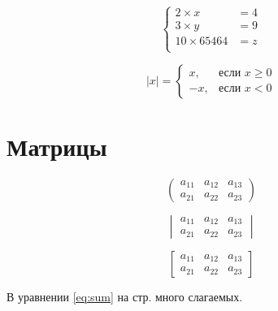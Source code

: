 \documentclass[a4paper,12pt]{article} %
\begin{document}
\[
	\left\{
		\begin{aligned}
			2\times x &= 4  \\
			3\times y &= 9\\
			10 \times 65464 &= z\\
		\end{aligned}
	\right.
\]

\[
	|x|=\begin{cases}
		x, &\text{если }  x \ge 0 \\
		-x, &\text{если } x<0
	\end{cases}
\]

\section{Матрицы}

\[
	\begin{pmatrix}
		a_{11} & a_{12} & a_{13} \\
		a_{21} & a_{22} & a_{23}
	\end{pmatrix}
\]

\[
	\begin{vmatrix}
		a_{11} & a_{12} & a_{13} \\
		a_{21} & a_{22} & a_{23}
	\end{vmatrix}
\]

\[
	\begin{bmatrix}
		a_{11} & a_{12} & a_{13} \\
		a_{21} & a_{22} & a_{23}
	\end{bmatrix}
\]

В уравнении \eqref{eq:sum} на стр. \pageref{eq:sum} много слагаемых.
\end{document}
